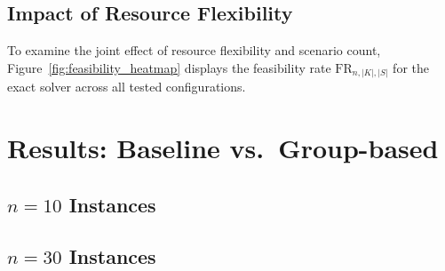 \subsection{Impact of Resource Flexibility}
\label{subsec:exact_resources}


To examine the joint effect of resource flexibility and
scenario count, Figure~\ref{fig:feasibility_heatmap} displays
the feasibility rate $\mathrm{FR}_{n,|K|,|S|}$ for the exact
solver across all tested configurations.




\section{Results: Baseline vs.\ Group-based}
\label{sec:baseline_vs_group}

\subsection{\texorpdfstring{$n=10$}{n=10} Instances}
\label{subsec:n10_results}


\subsection{\texorpdfstring{$n=30$}{n=30} Instances}
\label{subsec:n30_results}

